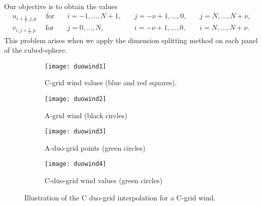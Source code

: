 Our objective is to obtain the values 
\begin{align*}
	u_{i+\frac{1}{2},j,p} \quad \text{ for} \quad &i=-1, \ldots, N+1, \quad &j=-\nu+1, \ldots, 0, \quad &j=N, \ldots, N+\nu,\\
	v_{i,j+\frac{1}{2},p} \quad \text{ for} \quad &j=0, \ldots, N, \quad &i=-\nu+1, \ldots, 0,\quad &i=N, \ldots, N+\nu.
\end{align*}
This problem arises when we apply the dimension splitting method on each panel of the cubed-sphere.
\begin{figure}[!htb]
	\centering
	\begin{subfigure}{0.45\textwidth}
		\centering
		\texttt{[image: duowind1]}
		\caption{C-grid wind values (blue and red squares).\label{cs-duovec-1}}
	\end{subfigure}
	\begin{subfigure}{0.45\textwidth}
		\centering
		\texttt{[image: duowind2]}
		\caption{A-grid wind (black circles)\label{cs-duovec-2}}
	\end{subfigure}
	
	\begin{subfigure}{0.45\textwidth}
		\centering
		\texttt{[image: duowind3]}
		\caption{A-duo-grid points (green circles)\label{cs-duovec-3}}
	\end{subfigure}
	\begin{subfigure}{0.45\textwidth}
		\centering
		\texttt{[image: duowind4]}
		\caption{C-duo-grid  wind values (green circles) \label{cs-duovec-4}}
	\end{subfigure}
	\caption{Illustration of the C duo-grid interpolation for a C-grid wind. \label{cs-duovec}}
\end{figure}

